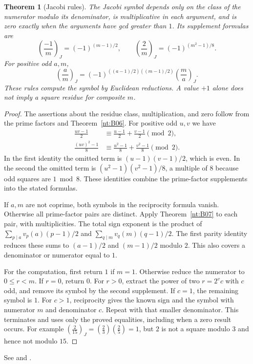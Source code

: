 \documentclass[11pt,oneside,openany]{book}
\theoremstyle{plain}
\newtheorem{theorem}{Theorem}[chapter]
\theoremstyle{definition}
\theoremstyle{remark}
\begin{document}
\begin{theorem}[Jacobi rules]\label{nt:B08}
The Jacobi symbol depends only on the class of the numerator
modulo its denominator, is multiplicative in each argument, and
is zero exactly when the arguments have gcd greater than $1$.
Its supplement formulas are
\[
 \left(\frac{-1}m\right)_{\!J}=(-1)^{(m-1)/2},\qquad
 \left(\frac 2m\right)_{\!J}=(-1)^{(m^2-1)/8}.
\]
For positive odd $a,m$,
\[
 \left(\frac am\right)_{\!J}
   =(-1)^{((a-1)/2)((m-1)/2)}\left(\frac ma\right)_{\!J}.
\]
These rules compute the symbol by Euclidean reductions. A value
$+1$ alone does not imply a square residue for composite $m$.
\end{theorem}
\begin{proof}
The assertions about the residue class, multiplication, and
zero follow from the prime factors and Theorem~\ref{nt:B06}.
For positive odd $u,v$ we have
\begin{align*}
 \frac{uv-1}{2}&\equiv\frac{u-1}{2}+\frac{v-1}{2}\pmod2,\\
 \frac{(uv)^2-1}{8}&\equiv\frac{u^2-1}{8}+\frac{v^2-1}{8}\pmod2.
\end{align*}
In the first identity the omitted term is $(u-1)(v-1)/2$,
which is even. In the second the omitted term is
$(u^2-1)(v^2-1)/8$, a multiple of $8$ because odd squares
are $1\bmod8$. These identities combine the prime-factor
supplements into the stated formulas.

If $a,m$ are not coprime, both symbols in the reciprocity
formula vanish. Otherwise all prime-factor pairs are distinct.
Apply Theorem~\ref{nt:B07} to each pair, with multiplicities.
The total sign exponent is the product of
$\sum_{p\mid a} v_p(a)(p-1)/2$ and
$\sum_{q\mid m} v_q(m)(q-1)/2$. The first parity identity
reduces these sums to $(a-1)/2$ and $(m-1)/2$ modulo $2$.
This also covers a denominator or numerator equal to $1$.

For the computation, first return $1$ if $m=1$. Otherwise
reduce the numerator to $0\le r<m$. If $r=0$, return $0$.
For $r>0$, extract the power of two $r=2^v c$ with $c$ odd,
and remove its symbol by the second supplement. If $c=1$,
the remaining symbol is $1$. For $c>1$, reciprocity gives
the known sign and the symbol with numerator $m$ and
denominator $c$. Repeat with that smaller denominator.
This terminates and uses only the proved equalities, including
when a zero result occurs. For example
$\left(\frac{2}{15}\right)_{\!J}
 =\left(\frac23\right)\left(\frac25\right)=1$,
but $2$ is not a square modulo $3$ and hence not modulo $15$.
\end{proof}
See \cite[\S9.7]{apostol} and \cite[\S3.3]{nzm}.
\end{document}

